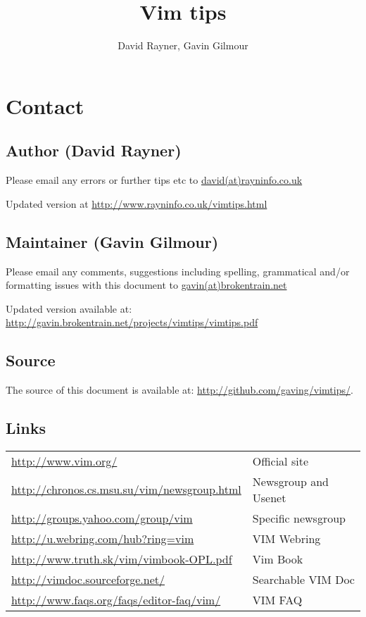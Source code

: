 \documentclass[10pt,landscape]{article}
\begin{document}
\title{Vim tips}
\author{David Rayner, Gavin Gilmour}

\maketitle
\tableofcontents
\newpage







\section{Contact}

\subsection{Author (David Rayner)}
Please email any errors or further tips etc to \href{mailto:david@rayninfo.co.uk}{david(at)rayninfo.co.uk}

Updated version at \url{http://www.rayninfo.co.uk/vimtips.html}

\subsection{Maintainer (Gavin Gilmour)}
Please email any comments, suggestions including spelling, grammatical and/or
formatting issues with this document to 
\href{mailto:gavin@brokentrain.net}{gavin(at)brokentrain.net}

Updated version available at: \url{http://gavin.brokentrain.net/projects/vimtips/vimtips.pdf}

\subsection{Source}
The source of this document is available at:
\url{http://github.com/gaving/vimtips/}.

\subsection{Links}
\begin{longtable}{l|l}
    \url{http://www.vim.org/} & Official site\\
    \url{http://chronos.cs.msu.su/vim/newsgroup.html} & Newsgroup and Usenet\\
    \url{http://groups.yahoo.com/group/vim} & Specific newsgroup\\
    \url{http://u.webring.com/hub?ring=vim} & VIM Webring\\
    \url{http://www.truth.sk/vim/vimbook-OPL.pdf} & Vim Book\\
    \url{http://vimdoc.sourceforge.net/} & Searchable VIM Doc\\
    \url{http://www.faqs.org/faqs/editor-faq/vim/} & VIM FAQ\\
\end{longtable}
\end{document}
